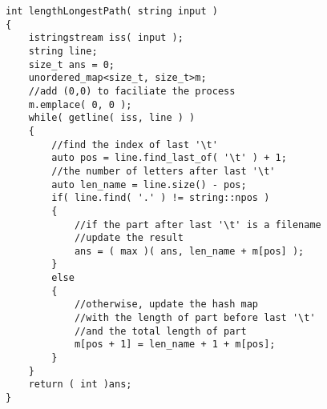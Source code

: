 \begin{lstlisting}[style=customc, caption={STL}]
int lengthLongestPath( string input )
{
    istringstream iss( input );
    string line;
    size_t ans = 0;
    unordered_map<size_t, size_t>m;
    //add (0,0) to faciliate the process
    m.emplace( 0, 0 );
    while( getline( iss, line ) )
    {
        //find the index of last '\t'
        auto pos = line.find_last_of( '\t' ) + 1;
        //the number of letters after last '\t'
        auto len_name = line.size() - pos;
        if( line.find( '.' ) != string::npos )
        {
            //if the part after last '\t' is a filename
            //update the result
            ans = ( max )( ans, len_name + m[pos] );
        }
        else
        {
            //otherwise, update the hash map
            //with the length of part before last '\t'
            //and the total length of part
            m[pos + 1] = len_name + 1 + m[pos];
        }
    }
    return ( int )ans;
}
\end{lstlisting}